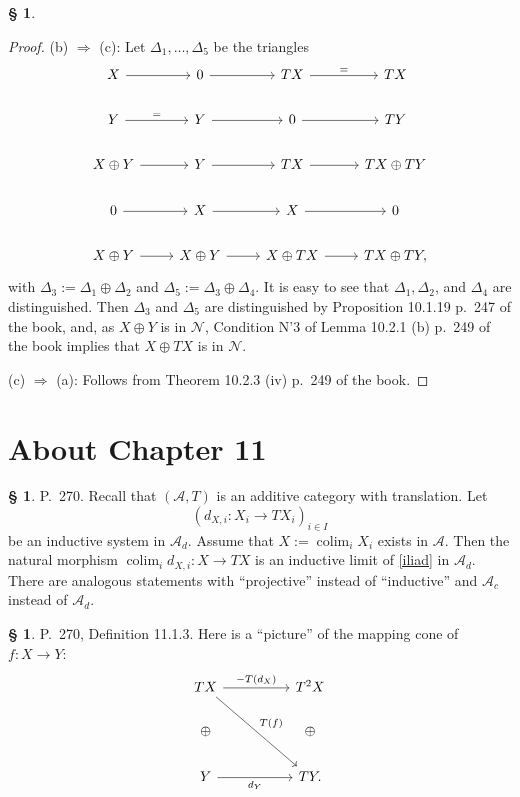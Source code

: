 \documentclass[12pt]{article}%
\theoremstyle{remark}
\theoremstyle{definition}
\newtheorem{s}[thm]{\S}%
\newcommand{\nn}{\noindent}
\newcommand{\cc}{\mathcal}
\newcommand{\A}{\mathcal A}
\newcommand{\then}{\Rightarrow}
\DeclareMathOperator*{\colim}{colim}%
\begin{document}
\begin{s}
\begin{proof}
\nn(b) $\then$ (c): Let $\Delta_1,\dots,\Delta_5$ be the triangles
$$
\begin{tikzcd}
X\ar{r}&0\ar{r}&TX\ar{r}{=}&TX\\ 
Y\ar{r}{=}&Y\ar{r}&0\ar{r}&TY\\ 
X\oplus Y\ar{r}&Y\ar{r}&TX\ar{r}&TX\oplus TY\\ 
0\ar{r}&X\ar{r}&X\ar{r}&0\\ 
X\oplus Y\ar{r}&X\oplus Y\ar{r}&X\oplus TX\ar{r}&TX\oplus TY,
\end{tikzcd}
$$ 
with $\Delta_3:=\Delta_1\oplus\Delta_2$ and $\Delta_5:=\Delta_3\oplus\Delta_4$. It is easy to see that $\Delta_1,\Delta_2$, and $\Delta_4$ are distinguished. Then $\Delta_3$ and $\Delta_5$ are distinguished by Proposition 10.1.19 p.~247 of the book, and, as $X\oplus Y$ is in $\cc N$, Condition N'3 of Lemma 10.2.1 (b) p.~249 of the book implies that $X\oplus TX$ is in $\cc N$.

\nn(c) $\then$ (a): Follows from Theorem 10.2.3 (iv) p.~249 of the book.
\end{proof}
\end{s}


\section{About Chapter 11}

\begin{s}
P.~270. Recall that $(\A,T)$ is an additive category with translation. Let 
\begin{equation}\label{iliad}
(d_{X,i}:X_i\to TX_i)_{i\in I}
\end{equation} 
be an inductive system in $\A_d$. Assume that $X:=\colim_iX_i$ exists in $\A$. Then the natural morphism $\colim_id_{X,i}:X\to TX$ is an inductive limit of \eqref{iliad} in $\A_d$. There are analogous statements with ``projective'' instead of ``inductive'' and $\A_c$ instead of $\A_d$.
\end{s}

%

\begin{s}
P.~270, Definition 11.1.3. Here is a ``picture'' of the mapping cone of $f:X\to Y$:
$$
\begin{tikzcd}
TX\ar{rr}{-T(d_X)}\ar{rrdd}{T(f)}&&T^2X\\ 
\oplus&&\oplus\\ 
Y\ar{rr}[swap]{d_Y}&&TY.
\end{tikzcd}
$$
\end{s}
\end{document}
